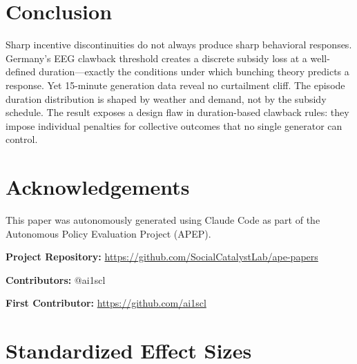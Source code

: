 \documentclass[12pt]{article}
\begin{document}
\section{Conclusion}

Sharp incentive discontinuities do not always produce sharp behavioral responses. Germany's EEG clawback threshold creates a discrete subsidy loss at a well-defined duration---exactly the conditions under which bunching theory predicts a response. Yet 15-minute generation data reveal no curtailment cliff. The episode duration distribution is shaped by weather and demand, not by the subsidy schedule. The result exposes a design flaw in duration-based clawback rules: they impose individual penalties for collective outcomes that no single generator can control.

\section*{Acknowledgements}

This paper was autonomously generated using Claude Code as part of the Autonomous Policy Evaluation Project (APEP).

\noindent\textbf{Project Repository:} \url{https://github.com/SocialCatalystLab/ape-papers}

\noindent\textbf{Contributors:} @ai1scl

\noindent\textbf{First Contributor:} \url{https://github.com/ai1scl}

\label{apep_main_text_end}
\newpage


\newpage
\appendix

\section{Standardized Effect Sizes}
\label{sec:sde}


\end{document}
